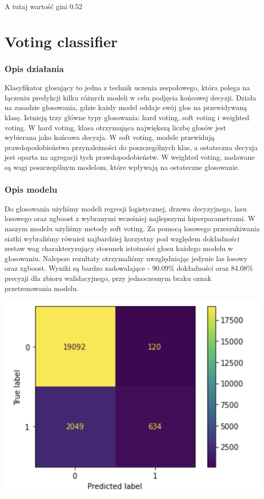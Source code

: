 \documentclass[11pt]{article}
\begin{document}
A tutaj wartość gini 0.52

    \hypertarget{voting-classifier}{%
\section{Voting classifier}\label{voting-classifier}}

\hypertarget{opis-dziaux142ania}{%
\subsubsection{Opis działania}\label{opis-dziaux142ania}}

Klasyfikator głosujący to jedna z technik uczenia zespołowego, która
polega na łączeniu predykcji kilku różnych modeli w celu podjęcia
końcowej decyzji. Działa na zasadzie głosowania, gdzie każdy model
oddaje swój głos na przewidywaną klasę. Istnieją trzy główne typy
głosowania: hard voting, soft voting i weighted voting. W hard voting,
klasa otrzymująca największą liczbę głosów jest wybierana jako końcowa
decyzja. W soft voting, modele przewidują prawdopodobieństwa
przynależności do poszczególnych klas, a ostateczna decyzja jest oparta
na agregacji tych prawdopodobieństw. W weighted voting, nadawane są wagi
poszczególnym modelom, które wpływają na ostateczne głosowanie.

\hypertarget{opis-modelu}{%
\subsubsection{Opis modelu}\label{opis-modelu}}

Do głosowania użyliśmy modeli regresji logistycznej, drzewa decyzyjnego,
lasu losowego oraz xgboost z wybranymi wcześniej najlepszymi
hiperparametrami. W naszym modelu użyliśmy metody soft voting. Za pomocą
losowego przeszukiwania siatki wybraliśmy również najbardziej korzystny
pod względem dokładności zestaw wag charakteryzujący stosunek istotności
głosu każdego modelu w głosowaniu. Nalepsze rezultaty otrzymaliśmy
uwzględniając jedynie las losowy oraz xgboost. Wyniki są bardzo
zadowalające - 90.09\% dokładności oraz 84.08\% precyzji dla zbioru
walidacyjnego, przy jednoczesnym braku oznak przetrenowania modelu.

\includegraphics{plots/voting_confusion.png}
\end{document}
